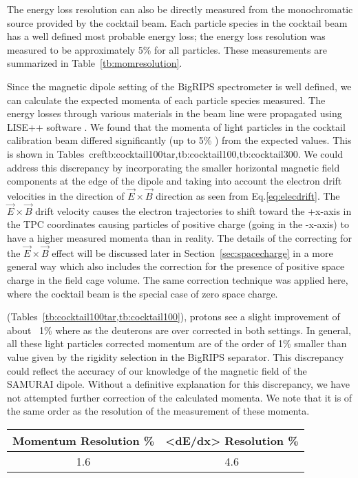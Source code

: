 The energy loss resolution can also be directly measured from the monochromatic source provided by the cocktail beam. Each particle species in the cocktail beam has a well defined most probable energy loss;  the energy loss resolution was measured to be approximately 5\% for all particles. These measurements are summarized in Table~\ref{tb:momresolution}.

Since the magnetic dipole setting of the BigRIPS spectrometer is well defined, we can calculate the expected momenta of each particle species measured. The energy losses through various materials in the beam line were propagated using LISE++ software \cite{lise++}. We found that the momenta of light particles in the  cocktail calibration beam differed significantly (up to 5\% ) from the expected values. This is shown in Tables~cref{tb:cocktail100tar,tb:cocktail100,tb:cocktail300}. We could address this discrepancy by incorporating the smaller horizontal magnetic field components at the edge of the dipole and taking into account the electron drift velocities in the direction of $\vec{E}\times\vec{B}$ direction as seen from Eq.\ref{eq:elecdrift}. The $\vec{E}\times\vec{B}$ drift velocity causes the electron trajectories to shift toward the +x-axis in the TPC coordinates causing particles of positive charge (going in the -x-axis) to have a higher measured momenta than in reality.  The details of the correcting for the $\vec{E}\times\vec{B}$ effect will be discussed later in Section~\ref{sec:spacecharge} in a more general way which also includes the correction for the presence of positive space charge in the field cage volume. The same correction technique was applied here, where the cocktail beam is the special case of zero space charge.

(Tables~\cref{tb:cocktail100tar,tb:cocktail100}), protons see a slight improvement of about ~1\% where as the deuterons are over corrected in both settings. In general, all these light particles corrected momentum are of the order of 1\% smaller than value given by the rigidity selection in the BigRIPS separator. This discrepancy could reflect the accuracy of our knowledge of the magnetic field of the SAMURAI dipole. Without a definitive explanation for this discrepancy, we have not attempted further correction of the calculated momenta. We note that it is of the same order as the resolution of the measurement of these momenta.  

\begin{table*}\centering
{}
\begin{tabular}{@{}cc@{}}\toprule
Momentum Resolution \% & <dE/dx> Resolution \% \\
\midrule
1.6  & 4.6\\
\bottomrule
\end{tabular}
\caption{Summary of the estimated momentum and energy loss resolutions.}
\label{tb:momresolution}
\end{table*}

